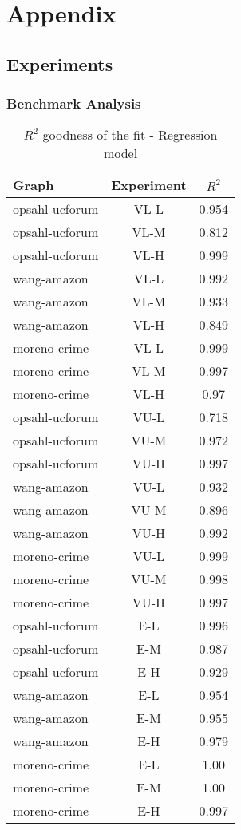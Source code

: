 \chapter{Appendix}
\section{Experiments}
\subsection{Benchmark Analysis}\label{app:exp:bench}
\begin{longtable}{|l|c|c|}
  \caption{$R^2$ goodness of the fit - Regression model}
  \label{table:app:exp:bench}\\
    \hline
   \textbf{Graph} & \textbf{Experiment} & \textbf{$R^2$}\\
   \hline
   opsahl-ucforum & VL-L & 0.954 \\
   \hline
   opsahl-ucforum & VL-M & 0.812 \\
   \hline
   opsahl-ucforum & VL-H & 0.999 \\
   \hline
   wang-amazon & VL-L & 0.992 \\
   \hline
   wang-amazon & VL-M & 0.933 \\
   \hline
   wang-amazon & VL-H & 0.849 \\
   \hline
   moreno-crime & VL-L & 0.999 \\
   \hline
   moreno-crime & VL-M & 0.997 \\
   \hline
   moreno-crime & VL-H & 0.97 \\
   \hline
   opsahl-ucforum & VU-L & 0.718 \\
   \hline
   opsahl-ucforum & VU-M & 0.972 \\
   \hline
   opsahl-ucforum & VU-H & 0.997 \\
   \hline
   wang-amazon & VU-L & 0.932 \\
   \hline
   wang-amazon & VU-M & 0.896 \\
   \hline
   wang-amazon & VU-H & 0.992 \\
   \hline
   moreno-crime & VU-L & 0.999 \\
   \hline
   moreno-crime & VU-M & 0.998 \\
   \hline
   moreno-crime & VU-H & 0.997 \\
   \hline
   opsahl-ucforum & E-L & 0.996 \\
   \hline
   opsahl-ucforum & E-M & 0.987 \\
   \hline
   opsahl-ucforum & E-H & 0.929 \\
   \hline
   wang-amazon & E-L & 0.954 \\
   \hline
   wang-amazon & E-M & 0.955 \\
   \hline
   wang-amazon & E-H & 0.979 \\
   \hline
   moreno-crime & E-L & 1.00 \\
   \hline
   moreno-crime & E-M & 1.00 \\
   \hline
   moreno-crime & E-H & 0.997 \\
   \hline
 \end{longtable}

